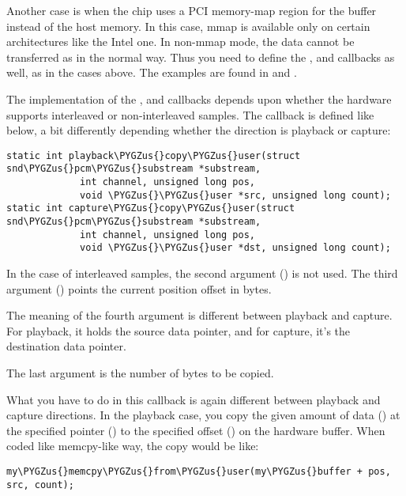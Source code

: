 \documentclass[a4paper,8pt,english]{sphinxmanual}
\def\PYGZus{\char`\_}
\begin{document}
Another case is when the chip uses a PCI memory-map region for the
buffer instead of the host memory. In this case, mmap is available only
on certain architectures like the Intel one. In non-mmap mode, the data
cannot be transferred as in the normal way. Thus you need to define the
,  and  callbacks as well,
as in the cases above. The examples are found in  and
.

The implementation of the ,  and
 callbacks depends upon whether the hardware supports
interleaved or non-interleaved samples. The  callback is
defined like below, a bit differently depending whether the direction
is playback or capture:

\begin{Verbatim}[commandchars=\\\{\}]
static int playback\PYGZus{}copy\PYGZus{}user(struct snd\PYGZus{}pcm\PYGZus{}substream *substream,
             int channel, unsigned long pos,
             void \PYGZus{}\PYGZus{}user *src, unsigned long count);
static int capture\PYGZus{}copy\PYGZus{}user(struct snd\PYGZus{}pcm\PYGZus{}substream *substream,
             int channel, unsigned long pos,
             void \PYGZus{}\PYGZus{}user *dst, unsigned long count);
\end{Verbatim}

In the case of interleaved samples, the second argument () is
not used. The third argument () points the current position
offset in bytes.

The meaning of the fourth argument is different between playback and
capture. For playback, it holds the source data pointer, and for
capture, it's the destination data pointer.

The last argument is the number of bytes to be copied.

What you have to do in this callback is again different between playback
and capture directions. In the playback case, you copy the given amount
of data () at the specified pointer () to the specified
offset () on the hardware buffer. When coded like memcpy-like
way, the copy would be like:

\begin{Verbatim}[commandchars=\\\{\}]
my\PYGZus{}memcpy\PYGZus{}from\PYGZus{}user(my\PYGZus{}buffer + pos, src, count);
\end{Verbatim}
\end{document}
